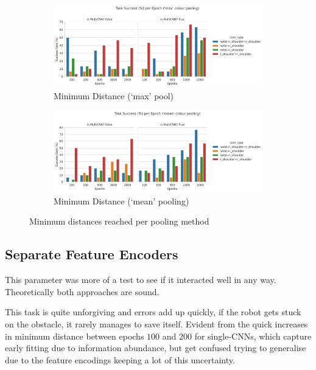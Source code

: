 \begin{figure}[htpb]
  \centering
  \begin{subfigure}{\linewidth}
    \centering
    \includegraphics[width=\linewidth]{assets/evaluation/cam-attn/ro_random-cam_attn-max-success.png}
    \caption{Minimum Distance (`max' pool)}\label{subfig:cam-attn-max-success-cnn}
  \end{subfigure}

  \begin{subfigure}{\linewidth}
    \centering
    \includegraphics[width=\linewidth]{assets/evaluation/cam-attn/ro_random-cam_attn-mean-success.png}
    \caption{Minimum Distance (`mean' pooling)}\label{subfig:cam-attn-mean-success-cnn}
  \end{subfigure}
  \caption{Minimum distances reached per pooling method}\label{fig:cam-attn-success-cnn}
\end{figure}

\subsection{Separate Feature Encoders}
This parameter was more of a test to see if it interacted well in any way. Theoretically both approaches are sound. 

This task is quite unforgiving and errors add up quickly, if the robot gets stuck on the obstacle, it rarely manages to save itself. Evident from the quick increases in minimum distance between epochs $100$ and $200$ for single-CNNs, which capture early fitting due to information abundance, but get confused trying to generalise due to the feature encodings keeping a lot of this uncertainty.

